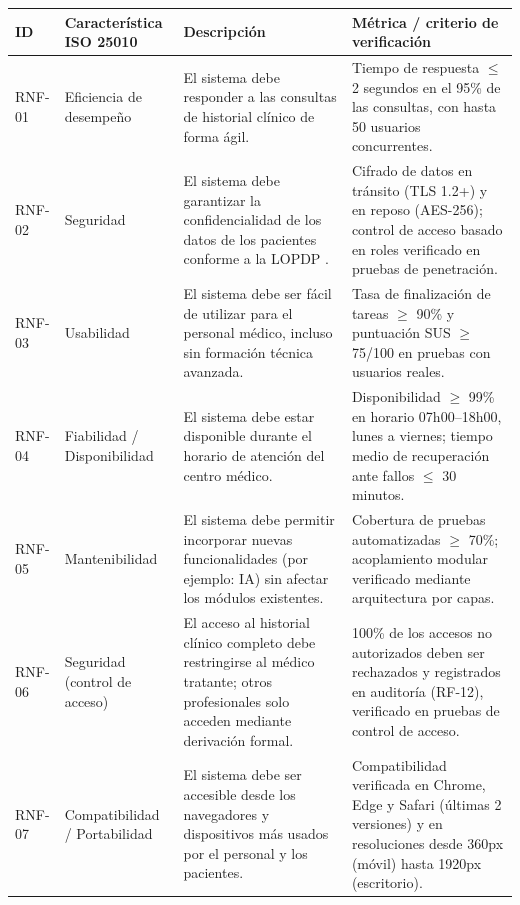 \documentclass[11pt,a4paper]{article}
\begin{document}
	
	\begin{longtable}{
			p{}
			p{}
			p{}
			p{}
		}
		
		\toprule
		\textbf{ID} &
		\textbf{Característica ISO 25010} &
		\textbf{Descripción} &
		\textbf{Métrica / criterio de verificación} \\
		\midrule
		\endhead
		
		RNF-01 &
		Eficiencia de desempeño &
		El sistema debe responder a las consultas de historial clínico de forma ágil. &
		Tiempo de respuesta \(\leq\) 2 segundos en el 95\% de las consultas, con hasta 50 usuarios concurrentes. \\
		
		RNF-02 &
		Seguridad &
		El sistema debe garantizar la confidencialidad de los datos de los pacientes conforme a la LOPDP \cite{loppd}. &
		Cifrado de datos en tránsito (TLS 1.2+) y en reposo (AES-256); control de acceso basado en roles verificado en pruebas de penetración. \\
		
		RNF-03 &
		Usabilidad &
		El sistema debe ser fácil de utilizar para el personal médico, incluso sin formación técnica avanzada. &
		Tasa de finalización de tareas \(\geq\) 90\% y puntuación SUS \(\geq\) 75/100 en pruebas con usuarios reales. \\
		
		RNF-04 &
		Fiabilidad / Disponibilidad &
		El sistema debe estar disponible durante el horario de atención del centro médico. &
		Disponibilidad \(\geq\) 99\% en horario 07h00--18h00, lunes a viernes; tiempo medio de recuperación ante fallos \(\leq\) 30 minutos. \\
		
		RNF-05 &
		Mantenibilidad &
		El sistema debe permitir incorporar nuevas funcionalidades (por ejemplo: IA) sin afectar los módulos existentes. &
		Cobertura de pruebas automatizadas \(\geq\) 70\%; acoplamiento modular verificado mediante arquitectura por capas. \\
		
		RNF-06 &
		Seguridad (control de acceso) &
		El acceso al historial clínico completo debe restringirse al médico tratante; otros profesionales solo acceden mediante derivación formal. &
		100\% de los accesos no autorizados deben ser rechazados y registrados en auditoría (RF-12), verificado en pruebas de control de acceso. \\
		
		RNF-07 &
		Compatibilidad / Portabilidad &
		El sistema debe ser accesible desde los navegadores y dispositivos más usados por el personal y los pacientes. &
		Compatibilidad verificada en Chrome, Edge y Safari (últimas 2 versiones) y en resoluciones desde 360px (móvil) hasta 1920px (escritorio). \\
		
		\bottomrule
		
	\end{longtable}
	
\end{document}
